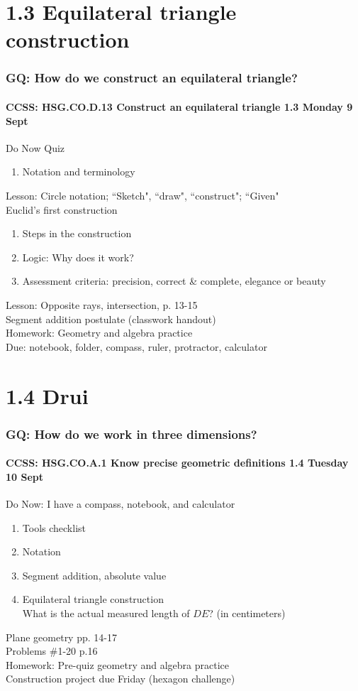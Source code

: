 \documentclass{beamer}
\begin{document}
\section{1.3 Equilateral triangle construction}
\frame
{
  \frametitle{GQ: How do we construct an equilateral triangle?}
  \framesubtitle{CCSS: HSG.CO.D.13 Construct an equilateral triangle \hfill \alert{1.3 Monday 9 Sept}}

  \begin{block}{Do Now Quiz}
  \begin{enumerate}
      \item Notation and terminology
  \end{enumerate}
  \end{block}
  Lesson: Circle notation; ``Sketch", ``draw", ``construct"; ``Given"\\[5pt]
  Euclid's first construction
  \begin{enumerate}
      \item Steps in the construction
      \item Logic: Why does it work?
      \item Assessment criteria: precision, correct \& complete, elegance or beauty
  \end{enumerate}
  \vspace{0.5cm}
  Lesson: Opposite rays, intersection, p. 13-15\\
  Segment addition postulate (classwork handout)\\
  Homework: Geometry and algebra practice\\
  Due: notebook, folder, compass, ruler, protractor, calculator
}

\section{1.4 Drui}
\frame
{
  \frametitle{GQ: How do we work in three dimensions?}
  \framesubtitle{CCSS: HSG.CO.A.1 Know precise geometric definitions  \hfill \alert{1.4 Tuesday 10 Sept}}

  \begin{block}{Do Now: I have a compass, notebook, and calculator}
  \begin{enumerate}
      \item Tools checklist
      \item Notation
      \item Segment addition, absolute value
      \item Equilateral triangle construction\\
      What is the actual measured length of $DE$? (in centimeters)
  \end{enumerate}
  \end{block}
  Plane geometry pp. 14-17\\ Problems \#1-20 p.16\\
  \vspace{0.5cm}
  Homework: Pre-quiz geometry and algebra practice\\
  Construction project due Friday (hexagon challenge)
}
\end{document}

